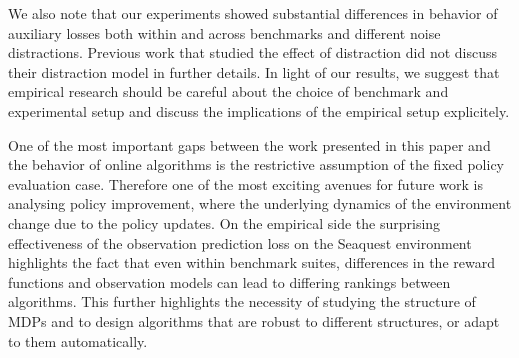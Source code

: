 We also note that our experiments showed substantial differences in behavior of auxiliary losses both within and across benchmarks and different noise distractions.
Previous work that studied the effect of distraction \parencite{nikishin2021control,voelcker2022value,ni2024bridging} did not discuss their distraction model in further details. 
In light of our results, we suggest that empirical research should be careful about the choice of benchmark and experimental setup and discuss the implications of the empirical setup explicitely.

One of the most important gaps between the work presented in this paper and the behavior of online algorithms is the restrictive assumption of the fixed policy evaluation case.
Therefore one of the most exciting avenues for future work is analysing policy improvement, where the underlying dynamics of the environment change due to the policy updates.
On the empirical side the surprising effectiveness of the observation prediction loss on the Seaquest environment highlights the fact that even within benchmark suites, differences in the reward functions and observation models can lead to differing rankings between algorithms.
This further highlights the necessity of studying the structure of MDPs and to design algorithms that are robust to different structures, or adapt to them automatically.
